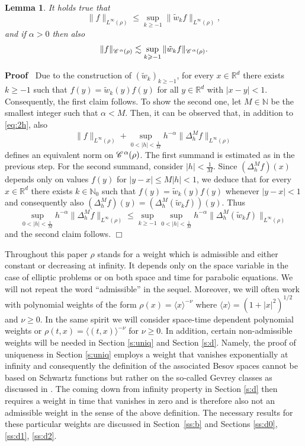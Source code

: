 \documentclass[a4paper,11pt]{article}
\renewcommand{\geq}{\geqslant}
\newenvironment{proof}{\noindent\textbf{Proof\ }}{\hspace*{\fill}$\Box$\medskip}
\newtheorem{lemma}[theorem]{Lemma}
\numberwithin{equation}{section}
\newcommand{\CC}{\mathscr{C} \hspace{.1em}}
\newcommand{\R}{\mathbb{R}}
\newcommand{\N}{\mathbb{N}}
\newcommand{\8}{\infty}
\begin{document}
\begin{lemma}\label{lem:2.1}
It holds true that
\[ \| f \|_{L^{\infty} (\rho)} \leqslant \sup_{k\geq-1} \| \tilde{w}_k f
   \|_{L^{\infty} (\rho)}, \]
and if $\alpha>0$ then also
   $$
   \| f \|_{\CC^{\alpha} (\rho)} \lesssim\sup_{k\geq-1} \| \tilde{w}_k f
   \|_{\CC^{\alpha} (\rho)}.
   $$
\end{lemma}

\begin{proof}
Due to the construction of $(\tilde w_k)_{k\geq -1}$, for every $x\in\R^d$ there exists $k\geq -1$ such that $f(y)=\tilde{w}_k(y)f(y)$ for all $y\in \R^d$ with $|x-y|<1$. Consequently, the first claim follows. To show the second one, let $M\in\N$ be the smallest integer such that $\alpha<M$.
Then, it can be observed that, in addition to \eqref{eq:2h}, also 
$$
\| f \|_{L^{\infty} (\rho)} +\sup_{0<|h|< \frac{1}{M}}h^{-\alpha}\|\Delta^M_h f\|_{L^\infty(\rho)}
$$
defines an equivalent norm on $\CC^\alpha(\rho)$. The first summand is estimated as in the previous step. For the second summand, consider $|h|<\frac{1}{M}$. Since $(\Delta^M_hf)(x)$ depends only on  values  $f(y)$ for  $|y-x|\leqslant M|h|<1$, we deduce that for every $x\in \R^d$ there exists $k\in\N_0$ such that $f(y)=\tilde w_k(y)f(y)$ whenever $|y-x|<1$ and consequently also $(\Delta^M_hf)(y)=(\Delta^M_h(\tilde w_kf))(y)$. Thus
$$
\sup_{0<|h|< \frac{1}{M}}h^{-\alpha}\|\Delta^M_h f\|_{L^\infty(\rho)}\leqslant \sup_{k\geq-1}\sup_{0<|h|< \frac{1}{M}}h^{-\alpha}\|\Delta^M_h (\tilde w_kf)\|_{L^\infty(\rho)}
$$
and the second claim follows.
\end{proof}




Throughout this paper $\rho$ stands for a weight which is admissible and either constant or decreasing at infinity. It depends only on the space variable in the case of elliptic problems  or on both space and time for parabolic equations. We will not repeat the word ``admissible'' in the sequel. Moreover,  we will often work with  polynomial weights of the form $\rho(x)=\langle x\rangle^{-\nu}$ where  $\langle x\rangle=(1+|x|^{2})^{1/2}$ and $\nu\geq 0$. In the same spirit we will consider space-time dependent polynomial weights or $\rho(t,x)=\langle (t,x)\rangle^{-\nu}$ for $\nu\geq 0$. In addition, certain non-admissible weights will be needed in Section \ref{s:uniq} and Section \ref{s:d}. Namely, the proof of uniqueness in Section \ref{s:uniq} employs a weight that vanishes exponentially at infinity and consequently the definition of the associated Besov spaces cannot be based on Schwartz functions but rather on the so-called Gevrey classes as discussed in \cite{MW17}. The coming down from infinity property in Section \ref{s:d} then requires a weight in time that vanishes in zero and is therefore also not an admissible weight in the sense of the above definition. The necessary results for these particular weights are discussed in Section~\ref{ss:b} and Sections \ref{ss:d0},  \ref{ss:d1}, \ref{ss:d2}.
\end{document}
